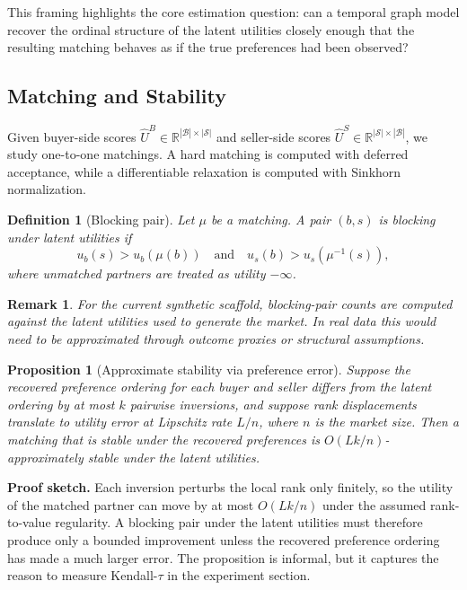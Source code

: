 \documentclass[11pt]{article}
\newtheorem{definition}{Definition}[section]
\newtheorem{proposition}{Proposition}[section]
\newtheorem{remark}{Remark}[section]
\newcommand{\buyers}{\mathcal{B}}
\newcommand{\sellers}{\mathcal{S}}
\newcommand{\R}{\mathbb{R}}
\begin{document}
This framing highlights the core estimation question: can a temporal graph
model recover the ordinal structure of the latent utilities closely enough that
the resulting matching behaves as if the true preferences had been observed?

\subsection{Matching and Stability}

Given buyer-side scores $\hat U^{B} \in \R^{|\buyers| \times |\sellers|}$ and
seller-side scores $\hat U^{S} \in \R^{|\sellers| \times |\buyers|}$, we study
one-to-one matchings. A hard matching is computed with deferred acceptance,
while a differentiable relaxation is computed with Sinkhorn normalization.

\begin{definition}[Blocking pair]
Let $\mu$ be a matching. A pair $(b,s)$ is blocking under latent utilities if
\[
u_b(s) > u_b(\mu(b))
\quad\text{and}\quad
u_s(b) > u_s(\mu^{-1}(s)),
\]
where unmatched partners are treated as utility $-\infty$.
\end{definition}

\begin{remark}
For the current synthetic scaffold, blocking-pair counts are computed against
the latent utilities used to generate the market. In real data this would need
to be approximated through outcome proxies or structural assumptions.
\end{remark}

\begin{proposition}[Approximate stability via preference error]
Suppose the recovered preference ordering for each buyer and seller differs from
the latent ordering by at most $k$ pairwise inversions, and suppose rank
displacements translate to utility error at Lipschitz rate $L / n$, where $n$
is the market size. Then a matching that is stable under the recovered
preferences is $O(Lk / n)$-approximately stable under the latent utilities.
\end{proposition}

\noindent\textbf{Proof sketch.}
Each inversion perturbs the local rank only finitely, so the utility of the
matched partner can move by at most $O(Lk / n)$ under the assumed rank-to-value
regularity. A blocking pair under the latent utilities must therefore produce
only a bounded improvement unless the recovered preference ordering has made a
much larger error. The proposition is informal, but it captures the reason to
measure Kendall-$\tau$ in the experiment section.
\end{document}
